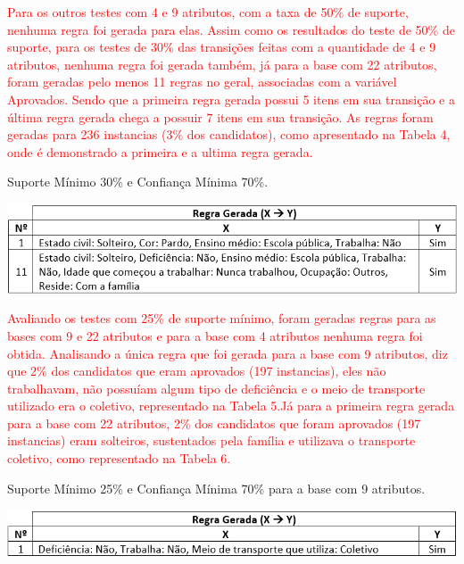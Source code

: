 \par
\textcolor{red}{Para os outros testes com 4 e 9 atributos, com a taxa de 50\% de suporte, nenhuma regra foi gerada para elas. Assim como os resultados do teste de 50\% de suporte, para os testes de 30\% das transições feitas com a quantidade de 4 e 9 atributos, nenhuma regra foi gerada também, já para a base com 22 atributos, foram geradas pelo menos 11 regras no geral, associadas com a variável Aprovados. Sendo que a primeira regra gerada possui 5 itens em sua transição e a última regra gerada chega a possuir 7 itens em sua transição. As regras foram geradas para 236 instancias (3\% dos candidatos), como apresentado na Tabela 4, onde é demonstrado a primeira e a ultima regra gerada.}

\par
\begin{table}[!htp]
	\begin{center}
    \caption{\label{fig:waveform_fig} Suporte Mínimo 30\% e Confiança Mínima 70\%.}
	\includegraphics[scale=0.75]{Figuras/Suporte_30_atributos_22.png}
	\end{center}
\end{table}


\par
\textcolor{red}{Avaliando os testes com 25\% de suporte mínimo, foram geradas regras para as bases com 9 e 22 atributos e para a base com 4 atributos nenhuma regra foi obtida. Analisando a única regra que foi gerada para a base com 9 atributos, diz que 2\% dos candidatos que eram aprovados (197 instancias), eles não trabalhavam, não possuíam algum tipo de deficiência e o meio de transporte utilizado era o coletivo, representado na Tabela 5.Já para a primeira regra gerada para a base com 22 atributos, 2\% dos candidatos que foram aprovados (197 instancias) eram solteiros, sustentados pela família e utilizava o transporte coletivo, como representado na Tabela 6.}

\par
\begin{table}[!htp]
	\begin{center}
    \caption{\label{fig:waveform_fig} Suporte Mínimo 25\% e Confiança Mínima 70\% para a base com 9 atributos.}
	\includegraphics[scale=0.75]{Figuras/Suporte_25_atributos_9.png}
	\end{center}
\end{table}

